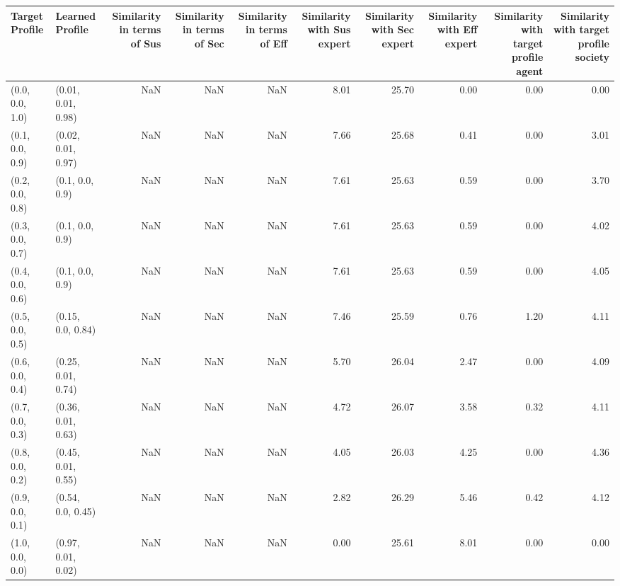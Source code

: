 \begin{tabular}{llrrrrrrrr}
\toprule
Target Profile & Learned Profile & Similarity in terms of Sus & Similarity in terms of Sec & Similarity in terms of Eff & Similarity with Sus expert & Similarity with Sec expert & Similarity with Eff expert & Similarity with target profile agent & Similarity with target profile society \\
\midrule
(0.0, 0.0, 1.0) & (0.01, 0.01, 0.98) & NaN & NaN & NaN & 8.01 & 25.70 & 0.00 & 0.00 & 0.00 \\
(0.1, 0.0, 0.9) & (0.02, 0.01, 0.97) & NaN & NaN & NaN & 7.66 & 25.68 & 0.41 & 0.00 & 3.01 \\
(0.2, 0.0, 0.8) & (0.1, 0.0, 0.9) & NaN & NaN & NaN & 7.61 & 25.63 & 0.59 & 0.00 & 3.70 \\
(0.3, 0.0, 0.7) & (0.1, 0.0, 0.9) & NaN & NaN & NaN & 7.61 & 25.63 & 0.59 & 0.00 & 4.02 \\
(0.4, 0.0, 0.6) & (0.1, 0.0, 0.9) & NaN & NaN & NaN & 7.61 & 25.63 & 0.59 & 0.00 & 4.05 \\
(0.5, 0.0, 0.5) & (0.15, 0.0, 0.84) & NaN & NaN & NaN & 7.46 & 25.59 & 0.76 & 1.20 & 4.11 \\
(0.6, 0.0, 0.4) & (0.25, 0.01, 0.74) & NaN & NaN & NaN & 5.70 & 26.04 & 2.47 & 0.00 & 4.09 \\
(0.7, 0.0, 0.3) & (0.36, 0.01, 0.63) & NaN & NaN & NaN & 4.72 & 26.07 & 3.58 & 0.32 & 4.11 \\
(0.8, 0.0, 0.2) & (0.45, 0.01, 0.55) & NaN & NaN & NaN & 4.05 & 26.03 & 4.25 & 0.00 & 4.36 \\
(0.9, 0.0, 0.1) & (0.54, 0.0, 0.45) & NaN & NaN & NaN & 2.82 & 26.29 & 5.46 & 0.42 & 4.12 \\
(1.0, 0.0, 0.0) & (0.97, 0.01, 0.02) & NaN & NaN & NaN & 0.00 & 25.61 & 8.01 & 0.00 & 0.00 \\
\bottomrule
\end{tabular}
